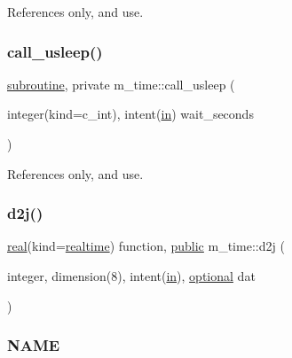 References only, and use.

\mbox{\label{namespacem__time_ae63783f7479d2f5093c8031d38ce4304}} 
\subsubsection{\texorpdfstring{call\+\_\+usleep()}{call\_usleep()}}
{\footnotesize\ttfamily \hyperlink{M__stopwatch_83_8txt_acfbcff50169d691ff02d4a123ed70482}{subroutine}, private m\+\_\+time\+::call\+\_\+usleep (\begin{DoxyParamCaption}\item[{integer(kind=c\+\_\+int), intent(\hyperlink{M__journal_83_8txt_afce72651d1eed785a2132bee863b2f38}{in})}]{wait\+\_\+seconds }\end{DoxyParamCaption})\hspace{0.3cm}{\ttfamily [private]}}



References only, and use.

\mbox{\label{namespacem__time_a3fccc53c2650104eff084c7998d18f54}} 
\subsubsection{\texorpdfstring{d2j()}{d2j()}}
{\footnotesize\ttfamily \hyperlink{read__watch_83_8txt_abdb62bde002f38ef75f810d3a905a823}{real}(kind=\hyperlink{namespacem__time_ac10ea9e8d59ec74eaa7d89f2517d7422}{realtime}) function, \hyperlink{M__stopwatch_83_8txt_a2f74811300c361e53b430611a7d1769f}{public} m\+\_\+time\+::d2j (\begin{DoxyParamCaption}\item[{integer, dimension(8), intent(\hyperlink{M__journal_83_8txt_afce72651d1eed785a2132bee863b2f38}{in}), \hyperlink{option__stopwatch_83_8txt_aa4ece75e7acf58a4843f70fe18c3ade5}{optional}}]{dat }\end{DoxyParamCaption})}



\subsubsection*{N\+A\+ME}

